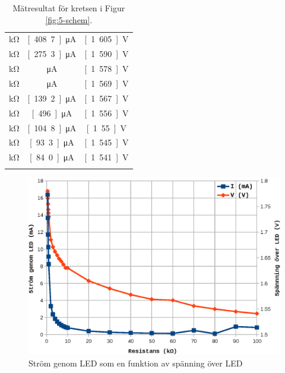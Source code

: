 \documentclass[11pt,a4paper]{article}
\begin{document}
\begin{longtable}[c]{@{}ccc@{}}
\unit[20]{\si{\kohm}} & \unit[408.7]{\si{\unit{\uA}}} & \unit[1.605]{\si{\volt}}
\\\addlinespace
\unit[30]{\si{\kohm}} & \unit[275.3]{\si{\unit{\uA}}} & \unit[1.590]{\si{\volt}}
\\\addlinespace
\unit[40]{\si{\kohm}} & \unit[2077]{\si{\unit{\uA}}} & \unit[1.578]{\si{\volt}}
\\\addlinespace
\unit[50]{\si{\kohm}} & \unit[1667]{\si{\unit{\uA}}} & \unit[1.569]{\si{\volt}}
\\\addlinespace
\unit[60]{\si{\kohm}} & \unit[139.2]{\si{\unit{\uA}}} & \unit[1.567]{\si{\volt}}
\\\addlinespace
\unit[70]{\si{\kohm}} & \unit[496.]{\si{\unit{\uA}}} & \unit[1.556]{\si{\volt}}
\\\addlinespace
\unit[80]{\si{\kohm}} & \unit[104.8]{\si{\unit{\uA}}} & \unit[1.55]{\si{\volt}}
\\\addlinespace
\unit[90]{\si{\kohm}} & \unit[93.3]{\si{\unit{\uA}}} & \unit[1.545]{\si{\volt}}
\\\addlinespace
\unit[100]{\si{\kohm}} & \unit[84.0]{\si{\unit{\uA}}} & \unit[1.541]{\si{\volt}}
\\\addlinespace
\bottomrule
\addlinespace
\caption[]{Mätresultat för kretsen i Figur \ref{fig:5-schem}.}
\label{emktable}
\end{longtable}

\begin{figure}
    \centering
    \includegraphics[width=\linewidth]{img/6-led_data-graf}
    \caption[Spänning och ström genom LED som funktion av serieresistans]
    {Ström genom LED som en funktion av spänning över LED}
    \label{fig:led-data-graf}
\end{figure}
\end{document}
